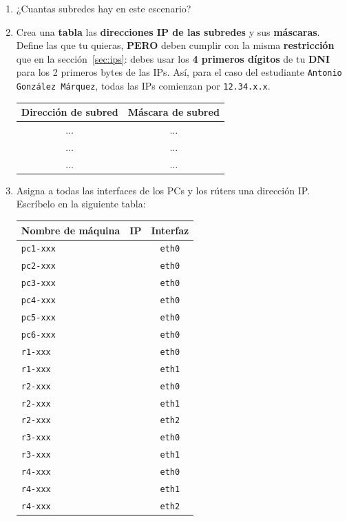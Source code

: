 \documentclass[a4paper]{article}
\begin{document}
\begin{enumerate}
    \item ¿Cuantas subredes hay en este escenario?
    
    \item Crea una \textbf{tabla} las \textbf{direcciones IP de las subredes} y sus \textbf{máscaras}. Define las que tu quieras, \textbf{PERO}  
	deben cumplir con la misma \textbf{restricción} que en la sección~\ref{sec:ips}: debes usar 
	los \textbf{4 primeros dígitos} de tu \textbf{DNI} para los 2 primeros bytes 
	de las IPs. Así, para el caso del estudiante \texttt{Antonio González Márquez}, todas
	las IPs comienzan por \texttt{12.34.x.x}.
	
	\bgroup
	\def\arraystretch{1.5}%
	\begin{tabular}{|c|c|}
		\hline 
		\textbf{Dirección de subred}& \textbf{Máscara de subred} \\ 
		\hline 
		$\dots$ & $\dots$ \\ 
		\hline 
		$\dots$ & $\dots$ \\ 
		\hline 
		$\dots$ & $\dots$ \\ 
		\hline 
	\end{tabular} 
	\egroup
	\medskip
	
	\item Asigna a todas las interfaces de los PCs y los rúters una dirección IP. Escríbelo
	en la siguiente tabla:
	\medskip
	
	\bgroup
	\def\arraystretch{1.5}%
	\begin{tabular}{|l|c|c|}
		\hline 
		\textbf{Nombre de máquina} & \textbf{IP} & \textbf{Interfaz} \\ 
		\hline 
		\texttt{pc1-xxx} & & \texttt{eth0} \\ 
		\hline 
		\texttt{pc2-xxx} & & \texttt{eth0} \\ 
		\hline 
		\texttt{pc3-xxx} & & \texttt{eth0} \\ 
		\hline 
		\texttt{pc4-xxx} & & \texttt{eth0} \\ 
		\hline 
		\texttt{pc5-xxx} & & \texttt{eth0} \\ 
		\hline 
		\texttt{pc6-xxx} & & \texttt{eth0} \\ 
		\hline 
		\texttt{r1-xxx} & & \texttt{eth0} \\ 
		\hline 
		\texttt{r1-xxx} & & \texttt{eth1} \\ 
		\hline 
		\texttt{r2-xxx} & & \texttt{eth0} \\ 
		\hline 
		\texttt{r2-xxx} & & \texttt{eth1} \\ 
		\hline 
		\texttt{r2-xxx} & & \texttt{eth2} \\ 
		\hline 
		\texttt{r3-xxx} & & \texttt{eth0} \\ 
		\hline 
		\texttt{r3-xxx} & & \texttt{eth1} \\ 
		\hline
		\texttt{r4-xxx} & & \texttt{eth0} \\ 
		\hline 
		\texttt{r4-xxx} & & \texttt{eth1} \\ 
		\hline 
		\texttt{r4-xxx} & & \texttt{eth2} \\ 
		\hline 
	\end{tabular} 
	\egroup
	\medskip
	

\end{enumerate}
\end{document}
